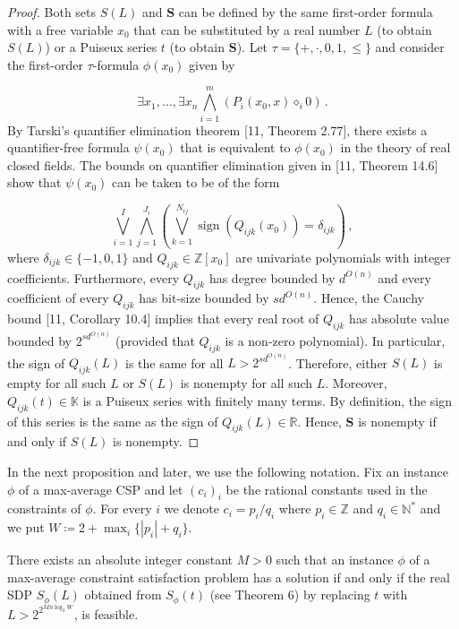 \begin{proof}
Both sets $S(L)$ and $\bm{S}$ can be defined by the same first-order formula with a free variable $x_{0}$ that can be substituted by a real number $L$ (to obtain $S(L)$) or a Puiseux series $t$ (to obtain $\bm{S}$). Let $\tau=\{+,\cdot,0,1,\leq\}$ and consider the first-order $\tau$-formula $\phi(x_{0})$ given by


\[
\exists x_{1},\dots,\exists x_{n}\operatorname*{\bigwedge}_{i=1}^{m}(P_{i}(x_{0},x)\diamond_{i}0)\,.
\]
By Tarski’s quantifier elimination theorem [11, Theorem 2.77], there exists a quantifier-free formula $\psi(x_{0})$ that is equivalent to $\phi(x_{0})$ in the theory of real closed fields. The bounds on quantifier elimination given in [11, Theorem 14.6] show that $\psi(x_{0})$ can be taken to be of the form


\[
\operatorname*{\bigvee}_{i=1}^{I}\operatorname*{\bigwedge}_{j=1}^{J_{i}}\left(\operatorname*{\bigvee}_{k=1}^{N_{ij}}\operatorname*{\mathrm{sign}}(Q_{ijk}(x_{0}))=\delta_{ijk}\right)\,,
\]
where $\delta_{ijk}\in\{-1,0,1\}$ and $Q_{ijk}\in\mathbb{Z}[x_{0}]$ are univariate polynomials with integer coefficients. Furthermore, every $Q_{ijk}$ has degree bounded by $d^{O(n)}$ and every coefficient of every $Q_{ijk}$ has bit-size bounded by $sd^{O(n)}$. Hence, the Cauchy bound [11, Corollary 10.4] implies that every real root of $Q_{ijk}$ has absolute value bounded by $2^{sd^{O(n)}}$ (provided that $Q_{ijk}$ is a non-zero polynomial). In particular, the sign of $Q_{ijk}(L)$ is the same for all $L>2^{sd^{O(n)}}$. Therefore, either $S(L)$ is empty for all such $L$ or $S(L)$ is nonempty for all such $L$. Moreover, $Q_{ijk}(t)\in\mathbb{K}$ is a Puiseux series with finitely many terms. By definition, the sign of this series is the same as the sign of $Q_{ijk}(L)\in\mathbb{R}$. Hence, $\bm{S}$ is nonempty if and only if $S(L)$ is nonempty. 

\end{proof}
In the next proposition and later, we use the following notation. Fix an instance $\phi$ of a max-average CSP and let $(c_{i})_{i}$ be the rational constants used in the constraints of $\phi$. For every $i$ we denote $c_{i}=p_{i}/q_{i}$ where $p_{i}\in\mathbb{Z}$ and $q_{i}\in\mathbb{N}^{*}$ and we put $W\coloneqq 2+\max_{i}\{|p_{i}|+q_{i}\}$.

\setcounter{theorem}{7}
\begin{proposition}\label{Thmtheorem8}
There exists an absolute integer constant $M>0$ such that an instance $\phi$ of a max-average constraint satisfaction problem has a solution if and only if the real SDP $S_{\phi}(L)$ obtained from $S_{\phi}(t)$ (see Theorem 6) by replacing $t$ with $L>2^{2^{Mn\log_{2}W}}$, is feasible.

\end{proposition}

